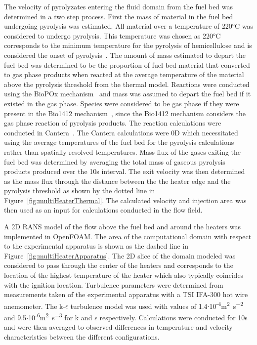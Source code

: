     The velocity of pyrolyzates entering the fluid domain from the fuel bed was determined in a two step process. First the mass of material in the fuel bed undergoing pyrolysis was estimated. All material over a temperature of 220\si{\celsius} was considered to undergo pyrolysis. This temperature was chosen as 220\si{\celsius} corresponds to the minimum temperature for the pyrolysis of hemicellulose and is considered the onset of pyrolysis~\cite{Yang2007a}. The amount of mass estimated to depart the fuel bed was determined to be the proportion of fuel bed material that converted to gas phase products when reacted at the average temperature of the material above the pyrolysis threshold from the thermal model. Reactions were conducted using the BioPOx mechanism~\cite{Dhahak2019} and mass was assumed to depart the fuel bed if it existed in the gas phase. Species were considered to be gas phase if they were present in the Bio1412 mechanism~\cite{Ranzi2001, Ranzi2008}, since the Bio1412 mechanism considers the gas phase reaction of pyrolysis products. The reaction calculations were conducted in Cantera~\cite{Goodwin2020}. The Cantera calculations were 0D which necessitated using the average temperatures of the fuel bed for the pyrolysis calculations rather than spatially resolved temperatures. Mass flux of the gases exiting the fuel bed was determined by averaging the total mass of gaseous pyrolysis products produced over the 10\si{\second} interval. The exit velocity was then determined as the mass flux through the distance between the the heater edge and the pyrolysis threshold as shown by the dotted line in Figure~\ref{fig:multiHeaterThermal}. The calculated velocity and injection area was then used as an input for calculations conducted in the flow field. 
    
    A 2D RANS model of the flow above the fuel bed and around the heaters was implemented in OpenFOAM. The area of the computational domain with respect to the experimental apparatus is shown as the dashed line in Figure~\ref{fig:multiHeaterApparatus}. The 2D slice of the domain modeled was considered to pass through the center of the heaters and corresponds to the location of the highest temperature of the heater which also typically coincides with the ignition location. Turbulence parameters were determined from measurements taken of the experimental apparatus with a TSI IFA-300 hot wire anemometer. The k-$\epsilon$ turbulence model was used with values of 1.4$\cdot$10\textsuperscript{-4}\si{\square\meter\per\square\second} and 9.5$\cdot$10\textsuperscript{-6}\si{\square\meter\per\cubic\second} for k and $\epsilon$ respectively. Calculations were conducted for 10\si{\second} and were then averaged to observed differences in temperature and velocity characteristics between the different configurations. 
    
